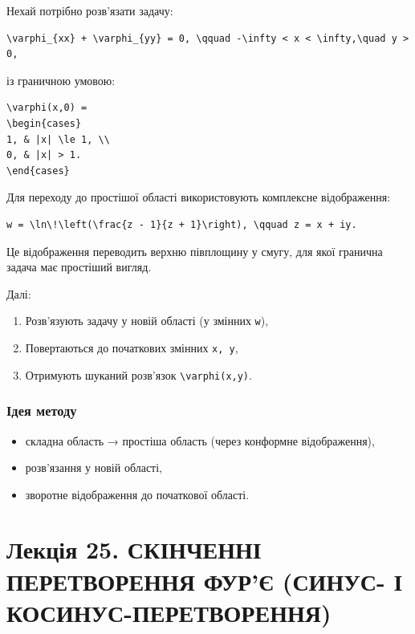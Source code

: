 \documentclass[
  ukrainian,
]{article}
\providecommand{\tightlist}{%
  \setlength{\itemsep}{0pt}\setlength{\parskip}{0pt}}
\begin{document}
Нехай потрібно розв'язати задачу:

\begin{verbatim}
\varphi_{xx} + \varphi_{yy} = 0, \qquad -\infty < x < \infty,\quad y > 0,
\end{verbatim}

із граничною умовою:

\begin{verbatim}
\varphi(x,0) =
\begin{cases}
1, & |x| \le 1, \\
0, & |x| > 1.
\end{cases}
\end{verbatim}

Для переходу до простішої області використовують комплексне
відображення:

\begin{verbatim}
w = \ln\!\left(\frac{z - 1}{z + 1}\right), \qquad z = x + iy.
\end{verbatim}

Це відображення переводить верхню півплощину у смугу, для якої гранична
задача має простіший вигляд.

Далі:

\begin{enumerate}
\def\labelenumi{\arabic{enumi}.}
\tightlist
\item
  Розв'язують задачу у новій області (у змінних \texttt{w}),
\item
  Повертаються до початкових змінних \texttt{x,\ y},
\item
  Отримують шуканий розв'язок \texttt{\textbackslash{}varphi(x,y)}.
\end{enumerate}

\subsubsection{Ідея
методу}\label{ux456ux434ux435ux44f-ux43cux435ux442ux43eux434ux443}

\begin{itemize}
\tightlist
\item
  складна область → простіша область (через конформне відображення),
\item
  розв'язання у новій області,
\item
  зворотне відображення до початкової області.
\end{itemize}

\section{Лекція 25. СКІНЧЕННІ ПЕРЕТВОРЕННЯ ФУР'Є (СИНУС- І
КОСИНУС-ПЕРЕТВОРЕННЯ)}\label{ux43bux435ux43aux446ux456ux44f-25.-ux441ux43aux456ux43dux447ux435ux43dux43dux456-ux43fux435ux440ux435ux442ux432ux43eux440ux435ux43dux43dux44f-ux444ux443ux440ux454-ux441ux438ux43dux443ux441--ux456-ux43aux43eux441ux438ux43dux443ux441-ux43fux435ux440ux435ux442ux432ux43eux440ux435ux43dux43dux44f}
\end{document}
